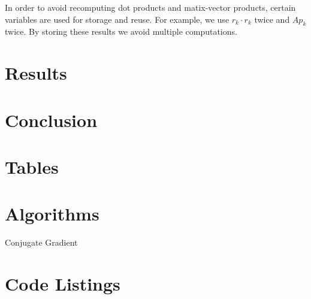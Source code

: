 In order to avoid recomputing dot products and matix-vector products, certain variables are used for storage and reuse.
For example, we use $r_k \cdot r_k$ twice and $A p_k$ twice. By storing these results we avoid multiple computations.


\section{Results}

\iffalse
Results:
Graphs, errors, convergence rates,
\fi


\section{Conclusion}

\iffalse
    Conclusion draws together strands of work throughout the report, 
    demonstrating how the results obtained relate to each other and 
    the broader context of the mathematical problem.

Discussion of results in context of problem
Talk about related algorithms
> BiCG
> CG squared
Preconditioning
Parallelisation, optimisations
Results
\fi

\clearpage
\appendix
\section{Tables}


\section{Algorithms}


\begin{algorithm}[H]



\caption{Conjugate Gradient}
\label{alg:cg}
\end{algorithm}


\section{Code Listings}
